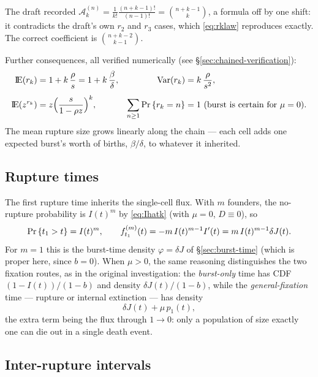 \begin{remark}
The draft recorded $\mathcal{A}^{(n)}_{k}=\frac{1}{k!}\frac{(n+k-1)!}{(n-1)!}
=\binom{n+k-1}{k}$, a formula off by one shift: it contradicts the draft's
own $r_2$ and $r_3$ cases, which \eqref{eq:rklaw} reproduces exactly. The
correct coefficient is $\binom{n+k-2}{k-1}$.
\end{remark}

Further consequences, all verified numerically (see
\S\ref{sec:chained-verification}):
\begin{align}
{\rm I}\!{\rm E}(r_k)&=1+k\,\frac{\rho}{s}=1+k\,\frac{\beta}{\delta},
&
\mathrm{Var}(r_k)&=k\,\frac{\rho}{s^2},
\label{eq:rkmoments}\\[0.4em]
{\rm I}\!{\rm E}(z^{r_k})&=z\Bigl(\frac{s}{1-\rho z}\Bigr)^k,
&
\sum_{n\ge1}{\text{Pr}\left\{r_k=n\right\}}&=1\ \text{(burst is certain for $\mu=0$)}.
\label{eq:rkgf}
\end{align}
The mean rupture size grows linearly along the chain --- each cell adds one
expected burst's worth of births, $\beta/\delta$, to whatever it inherited.

\subsection{Rupture times}
\label{sec:rupture-times}

The first rupture time inherits the single-cell flux. With $m$ founders, the
no-rupture probability is $I(t)^m$ by \eqref{eq:Ihatk} (with $\mu=0$,
$D\equiv0$), so
\begin{equation}
{\text{Pr}\left\{t_1>t\right\}}=I(t)^m,
\qquad
f_{t_1}^{(m)}(t)=-m\,I(t)^{m-1}I'(t)=m\,I(t)^{m-1}\delta J(t).
\label{eq:t1m}
\end{equation}
For $m=1$ this is the burst-time density $\varphi=\delta J$ of
\S\ref{sec:burst-time} (which is proper here, since $b=0$). When $\mu>0$,
the same reasoning distinguishes the two fixation routes, as in the
original investigation: the \emph{burst-only} time has CDF
$(1-I(t))/(1-b)$ and density $\delta J(t)/(1-b)$, while the
\emph{general-fixation} time --- rupture or internal extinction --- has
density
\begin{equation}
\delta J(t)+\mu\,p_1(t),
\end{equation}
the extra term being the flux through $1\to0$: only a population of size
exactly one can die out in a single death event.

\subsection{Inter-rupture intervals}

